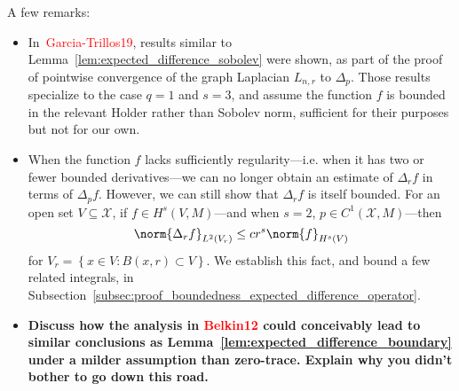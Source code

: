 \documentclass{article}
\newcommand{\set}[1]{\left\{#1\right\}}
\newcommand{\1}{\mathbf{1}}
\newcommand{\Lap}{L}
\newcommand{\Xset}{\mathcal{X}}
\newcommand{\Leb}{L}
\theoremstyle{alden}
\theoremstyle{aldenthm}
\theoremstyle{definition}
\theoremstyle{remark}
\begin{document}
A few remarks:
\begin{itemize}
	\item In~\textcolor{red}{Garcia-Trillos19}, results similar to Lemma~\ref{lem:expected_difference_sobolev} were shown, as part of the proof of pointwise convergence of the graph Laplacian $\Lap_{n,r}$ to $\Delta_p$. Those results specialize to the case $q = 1$ and $s = 3$, and assume the function $f$ is bounded in the relevant Holder rather than Sobolev norm, sufficient for their purposes but not for our own. 
	\item When the function $f$ lacks sufficiently regularity---i.e. when it has two or fewer bounded derivatives---we can no longer obtain an estimate of  $\Delta_rf$ in terms of $\Delta_pf$. However, we can still show that $\Delta_rf$ is itself bounded. For an open set $V \subseteq \Xset$, if $f \in H^{s}(V,M)$---and when $s = 2$, $p \in C^{1}(\Xset,M)$---then
	\begin{equation}
	\label{eqn:norm_expected_difference_operator}
	\norm{\Delta_rf}_{\Leb^2(V_r)} \leq c r^s \norm{f}_{H^s(V)}
	\end{equation}
	for $V_r = \set{x \in V: B(x,r) \subset V}$. We establish this fact, and bound a few related integrals, in Subsection~\ref{subsec:proof_boundedness_expected_difference_operator}.
	\item \textbf{Discuss how the analysis in \textcolor{red}{Belkin12} could conceivably lead to similar conclusions as Lemma~\ref{lem:expected_difference_boundary} under a milder assumption than zero-trace. Explain why you didn't bother to go down this road.}
\end{itemize}
\end{document}

